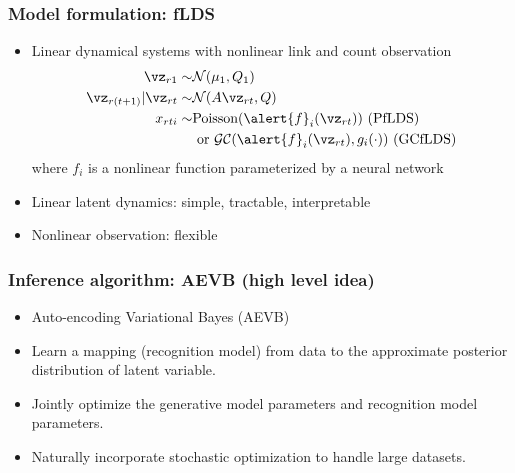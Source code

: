 \documentclass[16pt,presentation]{beamer}
\begin{document}
\begin{frame}
\frametitle{Model formulation: fLDS}
\begin{itemize}
 \item Linear dynamical systems with \alert{nonlinear link} and count observation
 \[\begin{split}
 \vz_{r1} \sim& \N(\mu_1, Q_1)\\
 \vz_{r(t+1)} | \vz_{rt} \sim& \N(A \vz_{rt}, Q)\\
 x_{rti} \sim& \text{Poisson}(\alert{f}_i(\vz_{rt})) \text{ (PfLDS) } \\
 &\text{   or }\mathcal{GC}(\alert{f}_i(\vz_{rt}), g_i(\cdot)) \text{ (GCfLDS)}%
 \end{split}\]
 where $f_i$ is a nonlinear function parameterized by a neural network
 \item Linear latent dynamics: simple, tractable, interpretable
 \item Nonlinear observation: flexible
\end{itemize}
\end{frame}

\begin{frame}
\frametitle{Inference algorithm: AEVB (high level idea)}
\begin{itemize}
\item Auto-encoding Variational Bayes (AEVB)
\item Learn a mapping (recognition model) from data to the \alert{approximate posterior distribution of latent variable}.
\item Jointly optimize the generative model parameters and recognition model parameters.
\item Naturally incorporate stochastic optimization to handle large datasets.
\end{itemize}
\end{frame}
\end{document}
